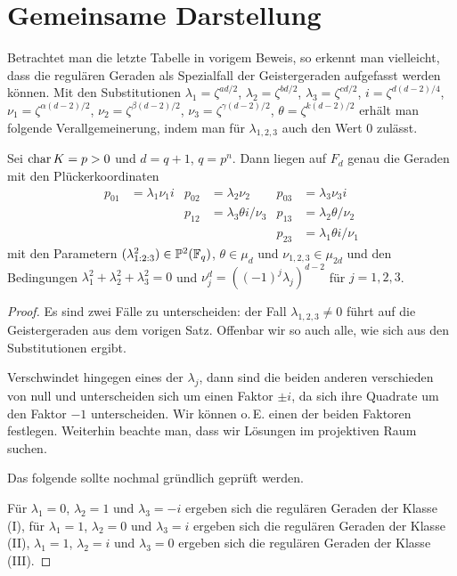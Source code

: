 \section{Gemeinsame Darstellung}
Betrachtet man die letzte Tabelle in vorigem Beweis, so erkennt man vielleicht, dass die regulären Geraden als Spezialfall der Geistergeraden aufgefasst werden können. Mit den Substitutionen $\lambda_1 = \zeta^{ad/2}$, $\lambda_2 = \zeta^{bd/2}$, $\lambda_3 = \zeta^{cd/2}$, $i = \zeta^{d(d-2)/4}$, $\nu_1 = \zeta^{\alpha(d-2)/2}$, $\nu_2 = \zeta^{\beta(d-2)/2}$, $\nu_3 = \zeta^{\gamma(d-2)/2}$, $\theta = \zeta^{k(d-2)/2}$ erhält man folgende Verallgemeinerung, indem man für $\lambda_{1,2,3}$ auch den Wert $0$ zulässt.
\begin{coroll}
Sei $\operatorname{char} K = p > 0$ und $d = q+1$, $q = p^n$. Dann liegen auf $F_d$ genau die Geraden mit den Plückerkoordinaten
\begin{align*}
p_{01} &= \lambda_1 \nu_1 i &p_{02} &= \lambda_2 \nu_2 &p_{03} &= \lambda_3 \nu_3 i \\
 & &p_{12} &= \lambda_3 \theta i / \nu_3 &p_{13} &= \lambda_2 \theta / \nu_2 \\
 & & & &p_{23} &= \lambda_1 \theta i / \nu_1
\end{align*}
mit den Parametern $(\lambda_{1:2:3}^2) \in \mathbb P^{2}(\mathbb F_q)$, $\theta \in \mu_d$ und $\nu_{1,2,3} \in \mu_{2d}$ und den Bedingungen $\lambda_1^2 + \lambda_2^2 + \lambda_3^2 = 0$ und $\nu_j^d = ((-1)^j \lambda_j)^{d-2}$ für $j=1,2,3$.
\end{coroll}
\begin{proof}
Es sind zwei Fälle zu unterscheiden: der Fall $\lambda_{1,2,3} \neq 0$ führt auf die Geistergeraden aus dem vorigen Satz. Offenbar wir so auch alle, wie sich aus den Substitutionen ergibt.

Verschwindet hingegen eines der $\lambda_j$, dann sind die beiden anderen verschieden von null und unterscheiden sich um einen Faktor $\pm i$, da sich ihre Quadrate um den Faktor $-1$ unterscheiden. Wir können o.\,E. einen der beiden Faktoren festlegen. Weiterhin beachte man, dass wir Lösungen im projektiven Raum suchen.

\todo Das folgende sollte nochmal gründlich geprüft werden.

Für $\lambda_1 = 0$, $\lambda_2 = 1$ und $\lambda_3 = -i$ ergeben sich die regulären Geraden der Klasse (I), für $\lambda_1 = 1$, $\lambda_2 = 0$ und $\lambda_3 = i$ ergeben sich die regulären Geraden der Klasse (II), $\lambda_1 = 1$, $\lambda_2 = i$ und $\lambda_3 = 0$ ergeben sich die regulären Geraden der Klasse (III).
\end{proof}
